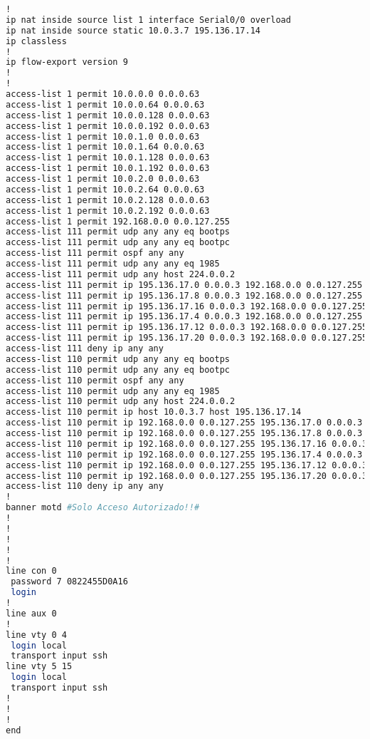 \begin{lstlisting}[language=Bash, caption={Configuración Completa Router Auxiliar 1}]
!
ip nat inside source list 1 interface Serial0/0 overload
ip nat inside source static 10.0.3.7 195.136.17.14 
ip classless
!
ip flow-export version 9
!
!
access-list 1 permit 10.0.0.0 0.0.0.63
access-list 1 permit 10.0.0.64 0.0.0.63
access-list 1 permit 10.0.0.128 0.0.0.63
access-list 1 permit 10.0.0.192 0.0.0.63
access-list 1 permit 10.0.1.0 0.0.0.63
access-list 1 permit 10.0.1.64 0.0.0.63
access-list 1 permit 10.0.1.128 0.0.0.63
access-list 1 permit 10.0.1.192 0.0.0.63
access-list 1 permit 10.0.2.0 0.0.0.63
access-list 1 permit 10.0.2.64 0.0.0.63
access-list 1 permit 10.0.2.128 0.0.0.63
access-list 1 permit 10.0.2.192 0.0.0.63
access-list 1 permit 192.168.0.0 0.0.127.255
access-list 111 permit udp any any eq bootps
access-list 111 permit udp any any eq bootpc
access-list 111 permit ospf any any
access-list 111 permit udp any any eq 1985
access-list 111 permit udp any host 224.0.0.2
access-list 111 permit ip 195.136.17.0 0.0.0.3 192.168.0.0 0.0.127.255
access-list 111 permit ip 195.136.17.8 0.0.0.3 192.168.0.0 0.0.127.255
access-list 111 permit ip 195.136.17.16 0.0.0.3 192.168.0.0 0.0.127.255
access-list 111 permit ip 195.136.17.4 0.0.0.3 192.168.0.0 0.0.127.255
access-list 111 permit ip 195.136.17.12 0.0.0.3 192.168.0.0 0.0.127.255
access-list 111 permit ip 195.136.17.20 0.0.0.3 192.168.0.0 0.0.127.255
access-list 111 deny ip any any
access-list 110 permit udp any any eq bootps
access-list 110 permit udp any any eq bootpc
access-list 110 permit ospf any any
access-list 110 permit udp any any eq 1985
access-list 110 permit udp any host 224.0.0.2
access-list 110 permit ip host 10.0.3.7 host 195.136.17.14
access-list 110 permit ip 192.168.0.0 0.0.127.255 195.136.17.0 0.0.0.3
access-list 110 permit ip 192.168.0.0 0.0.127.255 195.136.17.8 0.0.0.3
access-list 110 permit ip 192.168.0.0 0.0.127.255 195.136.17.16 0.0.0.3
access-list 110 permit ip 192.168.0.0 0.0.127.255 195.136.17.4 0.0.0.3
access-list 110 permit ip 192.168.0.0 0.0.127.255 195.136.17.12 0.0.0.3
access-list 110 permit ip 192.168.0.0 0.0.127.255 195.136.17.20 0.0.0.3
access-list 110 deny ip any any
!
banner motd #Solo Acceso Autorizado!!#
!
!
!
!
!
line con 0
 password 7 0822455D0A16
 login
!
line aux 0
!
line vty 0 4
 login local
 transport input ssh
line vty 5 15
 login local
 transport input ssh
!
!
!
end




\end{lstlisting}

